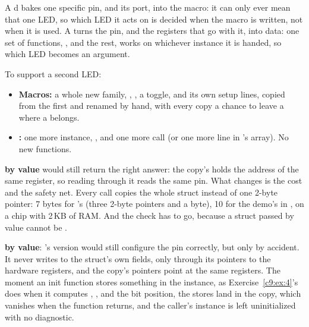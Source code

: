 
A d  bakes one specific pin, and its port, into the macro: it can only
ever mean that one LED, so which LED it acts on is decided when the macro is written, not when it
is used. A  turns the pin, and the registers that go with it, into data: one set of
functions, ,  and the rest, works on whichever instance it
is handed, so which LED becomes an argument.

To support a second LED:
\begin{itemize}
  \item \textbf{Macros:} a whole new family, , , a toggle, and its
    own setup lines, copied from the first and renamed by hand, with every copy a chance to leave a
     where a  belongs.
  \item \textbf{:} one more instance,
    , and one more  call (or one
    more line in 's  array). No new functions.
\end{itemize}

\textbf{ by value} would still return the right answer: the copy's 
holds the address of the same  register, so reading through it reads the same pin. What
changes is the cost and the safety net. Every call copies the whole struct instead of one 2-byte
pointer: 7 bytes for 's  (three 2-byte pointers and a byte), 10 for
the demo's in , on a chip with 2\,KB of RAM. And the  check has to go,
because a struct passed by value cannot be .

\textbf{ by value}: 's version would still configure the pin
correctly, but only by accident. It never writes to the struct's own fields, only through its
pointers to the hardware registers, and the copy's pointers point at the same registers. The moment
an init function stores something in the instance, as Exercise~\ref{c9:ex:4}'s does when it
computes , ,  and the bit position, the stores land in the copy,
which vanishes when the function returns, and the caller's instance is left uninitialized with no
diagnostic.

